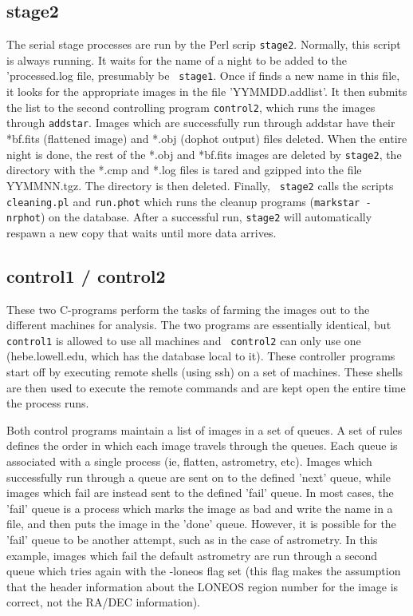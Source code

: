 \documentclass{article}
\begin{document}
\subsection{stage2}
The serial stage processes are run by the Perl scrip {\tt stage2}.
Normally, this script is always running.  It waits for the name of a
night to be added to the 'processed.log file, presumably be {\tt
stage1}.  Once if finds a new name in this file, it looks for the
appropriate images in the file 'YYMMDD.addlist'.  It then submits the
list to the second controlling program {\tt control2}, which runs the
images through {\tt addstar}.  Images which are successfully run
through addstar have their *bf.fits (flattened image) and *.obj
(dophot output) files deleted.  When the entire night is done, the
rest of the *.obj and *bf.fits images are deleted by {\tt stage2}, the
directory with the *.cmp and *.log files is tared and gzipped into the
file YYMMNN.tgz.  The directory is then deleted.  Finally, {\tt
stage2} calls the scripts {\tt cleaning.pl} and {\tt run.phot} which
runs the cleanup programs ({\tt markstar - nrphot}) on the database.
After a successful run, {\tt stage2} will automatically respawn a new
copy that waits until more data arrives.

\subsection{control1 / control2}
These two C-programs perform the tasks of farming the images out to
the different machines for analysis.  The two programs are essentially
identical, but {\tt control1} is allowed to use all machines and {\tt
control2} can only use one (hebe.lowell.edu, which has the database
local to it).  These controller programs start off by executing remote
shells (using ssh) on a set of machines.  These shells are then used
to execute the remote commands and are kept open the entire time the
process runs.  

Both control programs maintain a list of images in a set of queues.  A
set of rules defines the order in which each image travels through the
queues.  Each queue is associated with a single process (ie, flatten,
astrometry, etc).  Images which successfully run through a queue are
sent on to the defined 'next' queue, while images which fail are
instead sent to the defined 'fail' queue.  In most cases, the 'fail'
queue is a process which marks the image as bad and write the name in
a file, and then puts the image in the 'done' queue.  However, it is
possible for the 'fail' queue to be another attempt, such as in the
case of astrometry.  In this example, images which fail the default
astrometry are run through a second queue which tries again with the
-loneos flag set (this flag makes the assumption that the header
information about the LONEOS region number for the image is correct,
not the RA/DEC information).
\end{document}
